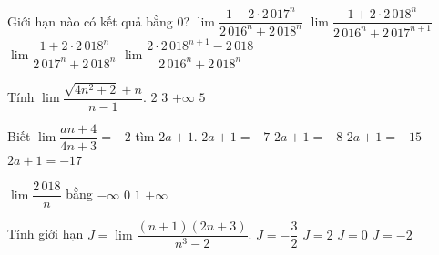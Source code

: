 \begin{ex}%
	Giới hạn nào  có kết quả bằng $0$?
	\choice 
		{\True  $\lim\dfrac{1+2\cdot 2\,017^{n}}{2\,016^{n}+2\,018^{n}}$}
		{$\lim\dfrac{1+2\cdot  2\,018^{n}}{2\,016^{n}+2\,017^{n+1}}$}
		 {$\lim\dfrac{1+2\cdot 2\,018^{n}}{2\,017^{n}+2\,018^{n}}$}
		{$\lim\dfrac{2\cdot  2\,018^{n+1}-2\,018}{2\,016^{n}+2\,018^{n}}$}
\end{ex}

\begin{ex}%
	Tính  $\lim\dfrac{\sqrt{4n^2+2}+n}{n-1}$.
	 \choice
		{$2$} 
		{\True  $3$}
		{$+\infty$} 
		{$5$} 
\end{ex}

\begin{ex}%
	Biết $\lim\dfrac {an+4}{4n+3}=-2$  tìm $2a+1$.
	\choice 
		{$2a+1=-7$} 
		{$2a+1=-8$} 
		{\True  $2a+1=-15$}
		 {$2a+1=-17$}
\end{ex}

\begin{ex}%
	${\lim\dfrac{2\,018}{n}}$ bằng 
	\choice 
		{$-\infty $} 
		{\True  $0$}
		{$1$} 
		 {$+\infty $}
\end{ex}

\begin{ex}%
	Tính giới hạn $J=\lim\dfrac {(n+1)(2n+3)}{n^3-2}$. 
	\choice 
		{$J=-\dfrac {3}{2}$} 
		{$J=2$} 
		{\True  $J=0$}
		{$J=-2$} 
\end{ex}

